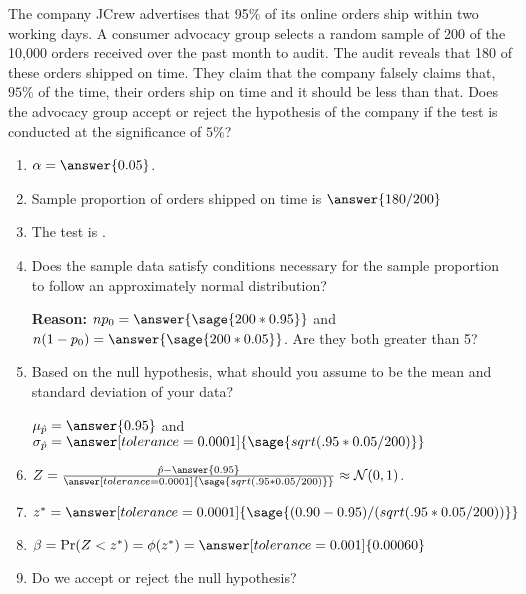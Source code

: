 \documentclass{ximera}
\begin{document}
\begin{problem}
The company JCrew advertises that 95\% of its online orders ship within two working
days. A consumer advocacy group selects a random sample of 200 of the 10,000 orders received over the past month to
audit. The audit reveals that 180 of these orders shipped on time. They claim that the company falsely claims that, $95\%$ of the time, their orders ship on time and it should be less than that. Does the advocacy group accept or reject the hypothesis of the company if the test is conducted at the significance of $5\%$?


\begin{enumerate}
    \item $\alpha=\answer{0.05}$.
    \item Sample proportion of orders shipped on time is $\answer{180/200}$
     \item The test is .
    \item Does the sample data satisfy conditions necessary for the sample proportion to follow an
approximately normal distribution?
\begin{multipleChoice}
\end{multipleChoice}
{\bf Reason:} $np_0=\answer{\sage{200*0.95}}$
and $n(1-p_0)=\answer{\sage{200*0.05}}$. Are they both greater than 5? 
    
    \item Based on the null hypothesis, what should you assume to be the mean and standard deviation of your data? 

$\mu_{\hat p}=\answer{0.95}$ and $\sigma_{\hat p}=\answer[tolerance=0.0001]{\sage{sqrt(.95*0.05/200)}}$
    \item $Z=\frac{\hat p -\answer{0.95}}{\answer[tolerance=0.0001]{\sage{sqrt(.95*0.05/200)}}}\approx \mathcal N(0,1)$.
    \item $z^*=\answer[tolerance=0.0001]{\sage{(0.90 -0.95)/(sqrt(.95*0.05/200))}}$
    \item $\beta=\Pr(Z<z^*)=\phi(z^*)=\answer[tolerance=0.001]{0.00060}$
    \item Do we accept or reject the null hypothesis?
    \begin{multipleChoice}
    \end{multipleChoice}
\end{enumerate}
\end{problem}
\end{document}
